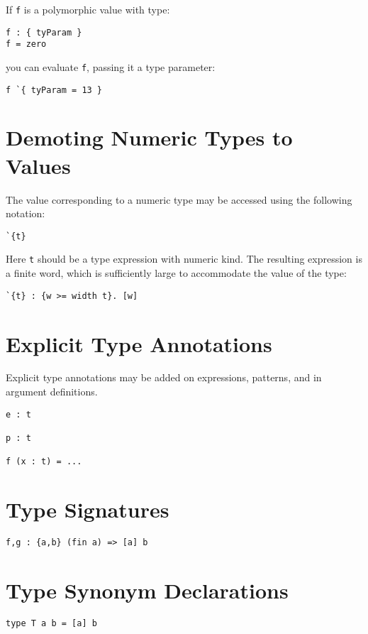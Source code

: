 If \texttt{f} is a polymorphic value with type:

\begin{verbatim}
f : { tyParam }
f = zero
\end{verbatim}

you can evaluate \texttt{f}, passing it a type parameter:

\begin{verbatim}
f `{ tyParam = 13 }
\end{verbatim}

\section{Demoting Numeric Types to
Values}\label{demoting-numeric-types-to-values}

The value corresponding to a numeric type may be accessed using the
following notation:

\begin{verbatim}
`{t}
\end{verbatim}

Here \texttt{t} should be a type expression with numeric kind. The
resulting expression is a finite word, which is sufficiently large to
accommodate the value of the type:

\begin{verbatim}
`{t} : {w >= width t}. [w]
\end{verbatim}

\section{Explicit Type Annotations}\label{explicit-type-annotations}

Explicit type annotations may be added on expressions, patterns, and in
argument definitions.

\begin{verbatim}
e : t

p : t

f (x : t) = ...
\end{verbatim}

\section{Type Signatures}\label{type-signatures}

\begin{verbatim}
f,g : {a,b} (fin a) => [a] b
\end{verbatim}

\section{Type Synonym Declarations}\label{type-synonym-declarations}

\begin{verbatim}
type T a b = [a] b
\end{verbatim}
